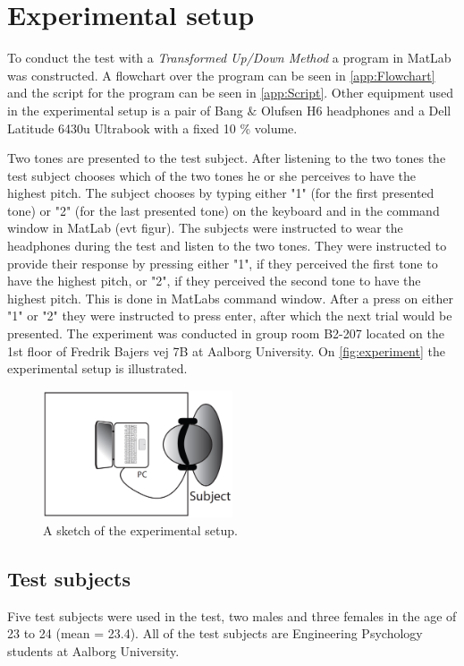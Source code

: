 \section*{Experimental setup}
%
To conduct the test with a \textit{Transformed Up/Down Method} a program in MatLab was constructed. A flowchart over the program can be seen in \autoref{app:Flowchart} and the script for the program can be seen in \autoref{app:Script}. Other equipment used in the experimental setup is a pair of Bang $\&$ Olufsen H6 headphones and a Dell Latitude 6430u Ultrabook with a fixed 10 \% volume.

Two tones are presented to the test subject. After listening to the two tones the test subject chooses which of the two tones he or she perceives to have the highest pitch. The subject chooses by typing either "1" (for the first presented tone) or "2" (for the last presented tone) on the keyboard and in the command window in MatLab (evt figur).\blankline
%
% 
\noindent
The subjects were instructed to wear the headphones during the test and listen to the two tones. They were instructed to provide their response by pressing either "1", if they perceived the first tone to have the highest pitch, or "2", if they perceived the second tone to have the highest pitch. This is done in MatLabs command window. After a press on either "1" or "2" they were instructed to press enter, after which the next trial would be presented.\blankline   
%
The experiment was conducted in group room B2-207 located on the 1st floor of Fredrik Bajers vej 7B at Aalborg University. On \autoref{fig:experiment} the experimental setup is illustrated. 
%
\begin{figure}[H]
\centering
\includegraphics[width = 0.5\textwidth]{Figure/experiment.png} 
\caption{A sketch of the experimental setup.}
\label{fig:experiment}
\end{figure}
%

\subsection*{Test subjects}
%
Five test subjects were used in the test, two males and three females in the age of 23 to 24 (mean = 23.4). All of the test subjects are Engineering Psychology students at Aalborg University. 